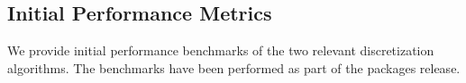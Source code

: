 \subsection{Initial Performance Metrics}
\label{sec:WP1:CGAL:metrics}



%

We provide initial performance benchmarks of the two relevant discretization algorithms.
The benchmarks have been performed as part of the packages release.

